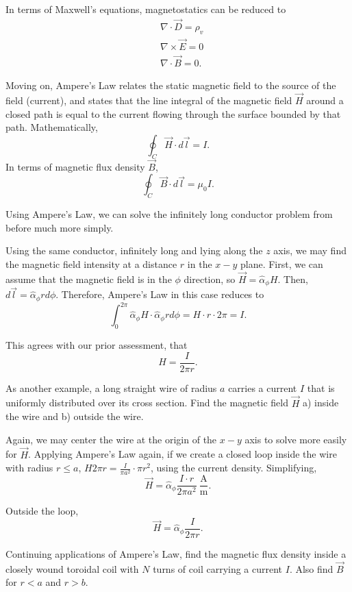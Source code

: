 \documentclass{article}
\begin{document}
In terms of Maxwell's equations, magnetostatics can be reduced to 
\begin{align*}
	& \nabla \cdot \vec{D} = \rho_v\\
	& \nabla \times \vec{E} = 0 \\
	& \nabla \cdot \vec{B} = 0.
\end{align*}

Moving on, Ampere's Law relates the static magnetic field to the source of the field (current), and states that the line integral of the magnetic field \(\vec{H}\) around a closed path is equal to the current flowing through the surface bounded by that path. Mathematically, 
\[
	\oint_C \vec{H} \cdot d \vec{l} = I.
\]
In terms of magnetic flux density \(\vec{B}\), 
\[
  \oint_C \vec{B} \cdot d \vec{l} = \mu_0 I.
\]

Using Ampere's Law, we can solve the infinitely long conductor problem from before much more simply. 

Using the same conductor, infinitely long and lying along the \(z\) axis, we may find the magnetic field intensity at a distance \(r\) in the \(x-y\) plane. First, we can assume that the magnetic field is in the \(\phi\) direction, so \(\vec{H} = \hat{\alpha}_\phi H\). Then, \(d \vec{l} = \hat{\alpha}_\phi r d \phi\). Therefore, Ampere's Law in this case reduces to 
\[
  \int_{0}^{2\pi} \hat{\alpha}_\phi H \cdot \hat{\alpha}_\phi r d\phi = H\cdot r \cdot 2\pi = I.
\]

This agrees with our prior assessment, that 
\[
  H = \frac{I}{2\pi r}.
\]

As another example, a long straight wire of radius \(a\) carries a current \(I\) that is uniformly distributed over its cross section. Find the magnetic field \(\vec{H}\) a) inside the wire and b) outside the wire.

Again, we may center the wire at the origin of the \(x-y\) axis to solve more easily for \(\vec{H}\). Applying Ampere's Law again, if we create a closed loop inside the wire with radius \(r \leq a\), \(H 2\pi r = \frac{I}{\pi a^2} \cdot \pi r^2\), using the current density. Simplifying, 
\[
	\vec{H} = \hat{\alpha}_\phi\frac{I \cdot r}{2 \pi a^2} \ \mathrm{\frac{A}{m}}.
\]

Outside the loop, 
\[
	\vec{H} = \hat{\alpha}_\phi	\frac{I}{2 \pi r}.
\]

Continuing applications of Ampere's Law, find the magnetic flux density inside a closely wound toroidal coil with \(N\) turns of coil carrying a current \(I\). Also find \(\vec{B}\) for \(r<a\) and \(r>b\). 
\end{document}
